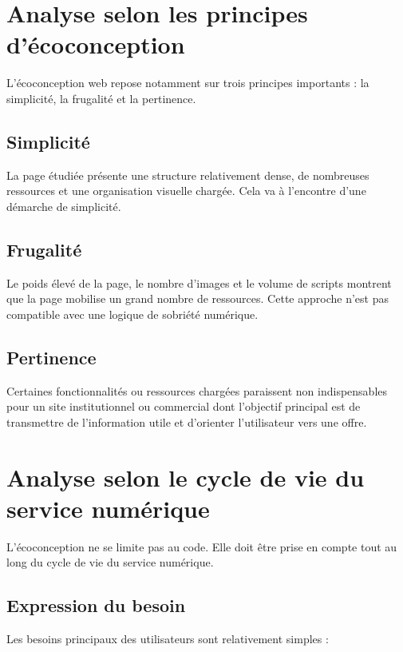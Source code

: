 \documentclass[11pt,a4paper]{article}
\begin{document}
\section{Analyse selon les principes d'écoconception}

L'écoconception web repose notamment sur trois principes importants : la simplicité, la frugalité et la pertinence.

\subsection{Simplicité}

La page étudiée présente une structure relativement dense, de nombreuses ressources et une organisation visuelle chargée. Cela va à l'encontre d'une démarche de simplicité.

\subsection{Frugalité}

Le poids élevé de la page, le nombre d'images et le volume de scripts montrent que la page mobilise un grand nombre de ressources. Cette approche n'est pas compatible avec une logique de sobriété numérique.

\subsection{Pertinence}

Certaines fonctionnalités ou ressources chargées paraissent non indispensables pour un site institutionnel ou commercial dont l'objectif principal est de transmettre de l'information utile et d'orienter l'utilisateur vers une offre.

\section{Analyse selon le cycle de vie du service numérique}

L'écoconception ne se limite pas au code. Elle doit être prise en compte tout au long du cycle de vie du service numérique.

\subsection{Expression du besoin}

Les besoins principaux des utilisateurs sont relativement simples :
\end{document}
